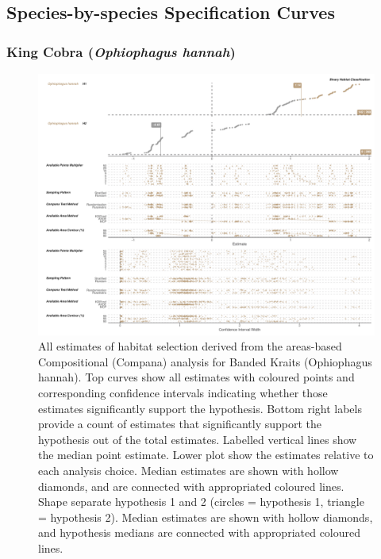 \documentclass[10pt,a4paper]{article}
\begin{document}
\subsection{Species-by-species Specification Curves}\label{species-by-species-specification-curves}

\subsubsection{\texorpdfstring{King Cobra (\emph{Ophiophagus hannah})}{King Cobra (Ophiophagus hannah)}}\label{king-cobra-ophiophagus-hannah}

\begin{figure}
\includegraphics[width=1\linewidth]{../../figures/specCurve_Ophiophagus hannah_area} \caption{All estimates of habitat selection derived from the areas-based Compositional (Compana) analysis for Banded Kraits (Ophiophagus hannah). Top curves show all estimates with coloured points and corresponding confidence intervals indicating whether those estimates significantly support the hypothesis. Bottom right labels provide a count of estimates that significantly support the hypothesis out of the total estimates. Labelled vertical lines show the median point estimate. Lower plot show the estimates relative to each analysis choice. Median estimates are shown with hollow diamonds, and are connected with appropriated coloured lines. Shape separate hypothesis 1 and 2 (circles = hypothesis 1, triangle = hypothesis 2). Median estimates are shown with hollow diamonds, and hypothesis medians are connected with appropriated coloured lines. }\label{fig:specCurveAreaOPHA}
\end{figure}
\end{document}
